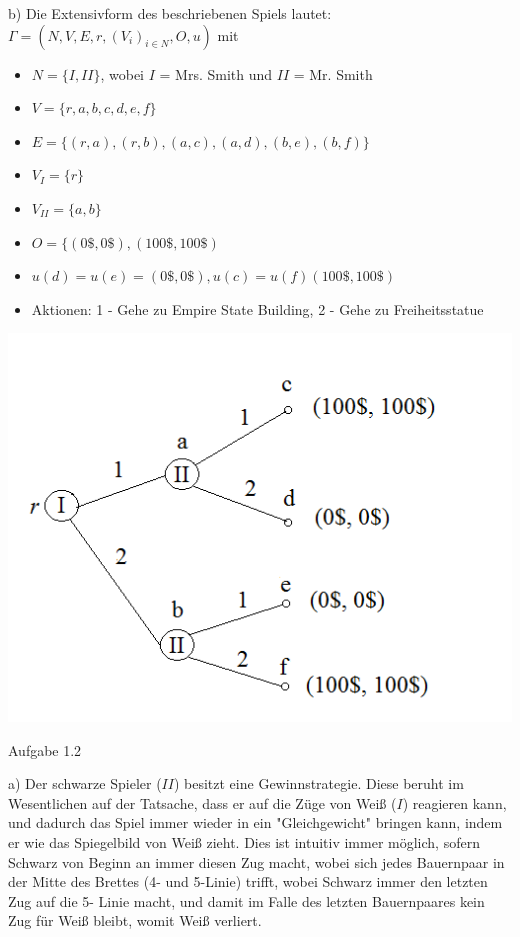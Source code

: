 \documentclass{scrartcl}
\begin{document}
b) Die Extensivform des beschriebenen Spiels lautet: $\Gamma = (N, V, E, r, (V_i)_{i \in N}, O, u)$ mit

\begin{itemize}
\item{$N = \{I, II\}$}, wobei $I$ = Mrs. Smith und $II$ = Mr. Smith
\item{$V = \{r, a, b, c, d, e, f\}$}
\item{$E = \{(r, a), (r, b), (a, c), (a, d), (b, e), (b, f)\}$}
\item{$V_I = \{r\}$}
\item{$V_{II} = \{a, b\}$}
\item{$O = \{(0\$, 0\$), (100\$, 100\$)$}
\item{$u(d) = u(e) = (0\$, 0\$), u(c) = u(f) (100\$, 100\$)$}
\item{Aktionen: 1 - Gehe zu Empire State Building, 2 - Gehe zu Freiheitsstatue}
\end{itemize}
\includegraphics[width=14.5cm]{spielbaum_1b.png} \\



\clearpage
\begin{Large}
Aufgabe 1.2\\[0.0cm]
\end{Large}

a) Der schwarze Spieler ($II$) besitzt eine Gewinnstrategie. Diese beruht im Wesentlichen auf der Tatsache, dass
er auf die Züge von Weiß ($I$) reagieren kann, und dadurch das Spiel immer wieder in ein "Gleichgewicht"
bringen
kann, indem er wie das Spiegelbild von Weiß zieht. Dies ist intuitiv immer möglich, sofern Schwarz von Beginn
an immer diesen Zug macht, wobei sich jedes
Bauernpaar in der Mitte des Brettes (4- und 5-Linie) trifft, wobei Schwarz immer den letzten Zug auf die 5-
Linie macht, und damit im Falle des letzten Bauernpaares kein Zug für Weiß bleibt, womit Weiß verliert.
\end{document}
